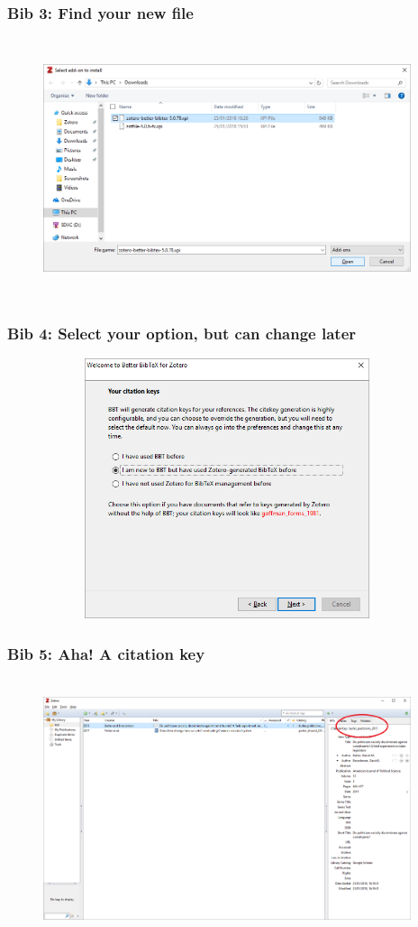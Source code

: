 \documentclass[12pt]{beamer}
\begin{document}
\begin{frame} \frametitle{Bib 3: Find your new file} \begin{figure}[!h] \centering
	\includegraphics[height=3in, width = 4.25in,keepaspectratio]{zotero/bibtex_3.png}
\end{figure} \end{frame}

\begin{frame} \frametitle{Bib 4: Select your option, but can change later} \begin{figure}[!h] \centering
	\includegraphics[height=3in, width = 4.25in,keepaspectratio]{zotero/bibtex_4.png}
\end{figure} \end{frame}

\begin{frame} \frametitle{Bib 5: Aha! A citation key} \begin{figure}[!h] \centering
	\includegraphics[height=3in, width = 4.25in,keepaspectratio]{zotero/bibtex_5.png}
\end{figure} \end{frame}
\end{document}
